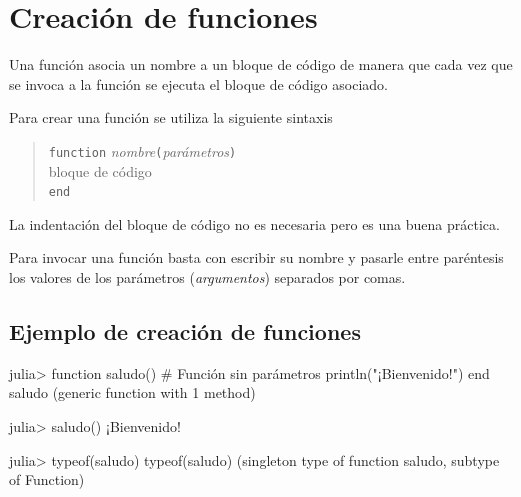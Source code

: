 \documentclass[
  letterpaper,
  DIV=11,
  numbers=noendperiod]{scrreprt}
\newenvironment{Shaded}{\begin{snugshade}}{\end{snugshade}}
\newcommand{\CommentTok}[1]{\textcolor[rgb]{0.37,0.37,0.37}{#1}}
\newcommand{\DataTypeTok}[1]{\textcolor[rgb]{0.68,0.00,0.00}{#1}}
\newcommand{\FloatTok}[1]{\textcolor[rgb]{0.68,0.00,0.00}{#1}}
\newcommand{\FunctionTok}[1]{\textcolor[rgb]{0.28,0.35,0.67}{#1}}
\newcommand{\KeywordTok}[1]{\textcolor[rgb]{0.00,0.23,0.31}{#1}}
\newcommand{\NormalTok}[1]{\textcolor[rgb]{0.00,0.23,0.31}{#1}}
\newcommand{\OperatorTok}[1]{\textcolor[rgb]{0.37,0.37,0.37}{#1}}
\newcommand{\StringTok}[1]{\textcolor[rgb]{0.13,0.47,0.30}{#1}}
\begin{document}
\hypertarget{creaciuxf3n-de-funciones}{%
\section{Creación de funciones}\label{creaciuxf3n-de-funciones}}

Una función asocia un nombre a un bloque de código de manera que cada
vez que se invoca a la función se ejecuta el bloque de código asociado.

Para crear una función se utiliza la siguiente sintaxis

\begin{quote}
\texttt{function} \emph{nombre}\texttt{(}\emph{parámetros}\texttt{)}\\
\hspace*{0.333em}\hspace*{0.333em}\hspace*{0.333em}bloque de código\\
\texttt{end}
\end{quote}

\begin{tcolorbox}[enhanced jigsaw, colbacktitle=quarto-callout-note-color!10!white, coltitle=black, opacityback=0, opacitybacktitle=0.6, bottomtitle=1mm, leftrule=.75mm, toprule=.15mm, bottomrule=.15mm, toptitle=1mm, breakable, colframe=quarto-callout-note-color-frame, colback=white, rightrule=.15mm, titlerule=0mm, title=\textcolor{quarto-callout-note-color}{\faInfo}\hspace{0.5em}{Note}, arc=.35mm, left=2mm]
La indentación del bloque de código no es necesaria pero es una buena
práctica.
\end{tcolorbox}

Para invocar una función basta con escribir su nombre y pasarle entre
paréntesis los valores de los parámetros (\emph{argumentos}) separados
por comas.

\hypertarget{ejemplo-de-creaciuxf3n-de-funciones}{%
\subsection{Ejemplo de creación de
funciones}\label{ejemplo-de-creaciuxf3n-de-funciones}}

\begin{Shaded}
\begin{Highlighting}[]
\NormalTok{julia}\OperatorTok{\textgreater{}} \KeywordTok{function} \FunctionTok{saludo}\NormalTok{()  }\CommentTok{\# Función sin parámetros}
         \FunctionTok{println}\NormalTok{(}\StringTok{"¡Bienvenido!"}\NormalTok{)}
       \KeywordTok{end}
\NormalTok{saludo (generic }\KeywordTok{function}\NormalTok{ with }\FloatTok{1}\NormalTok{ method)}

\NormalTok{julia}\OperatorTok{\textgreater{}} \FunctionTok{saludo}\NormalTok{()}
\NormalTok{¡Bienvenido!}

\NormalTok{julia}\OperatorTok{\textgreater{}} \FunctionTok{typeof}\NormalTok{(saludo)}
\FunctionTok{typeof}\NormalTok{(saludo) (singleton }\KeywordTok{type}\NormalTok{ of }\KeywordTok{function}\NormalTok{ saludo, subtype of }\DataTypeTok{Function}\NormalTok{)}
\end{Highlighting}
\end{Shaded}
\end{document}
